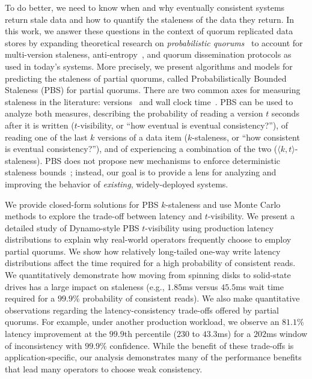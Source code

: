 \documentclass{vldb}
\begin{document}
To do better, we need to know when and why eventually consistent
systems return stale data and how to quantify the staleness of the
data they return.  In this work, we answer these questions in the
context of quorum replicated data stores by expanding theoretical
research on \textit{probabilistic quorums}~\cite{prob-quorum,
  quorum-overview} to account for multi-version staleness,
anti-entropy~\cite{antientropy}, and quorum dissemination protocols as
used in today's systems.  More precisely, we present algorithms and
models for predicting the staleness of partial quorums, called
Probabilistically Bounded Staleness (PBS) for partial quorums. There
are two common axes for measuring staleness in the literature:
versions~\cite{aqua, frac} and wall clock time~\cite{vahdat-article,
  vahdat-bounded}.  PBS can be used to analyze both measures,
describing the probability of reading a version $t$ seconds after it is
written ($t$-visibility, or ``how eventual is eventual
consistency?''), of reading one of the last $k$ versions of
a data item ($k$-staleness, or ``how consistent is eventual
consistency?''), and of experiencing a combination of the two
($\langle k, t \rangle$-staleness). PBS does not propose new
mechanisms to enforce deterministic staleness bounds~\cite{ aqua,
  trapp,vahdat-article, vahdat-bounded, frac}; instead, our goal is to
provide a lens for analyzing and improving the behavior of
\textit{existing}, widely-deployed systems.

We provide closed-form solutions for PBS $k$-staleness and use Monte
Carlo methods to explore the trade-off between latency and
$t$-visibility.  We present a detailed study of Dynamo-style PBS
$t$-visibility using production latency distributions to explain why
real-world operators frequently choose to employ partial quorums. We
show how relatively long-tailed one-way write latency distributions
affect the time required for a high probability of consistent reads.
We quantitatively demonstrate how moving from spinning disks to
solid-state drives has a large impact on staleness (e.g., $1.85$ms
versus $45.5$ms wait time required for a $99.9$\% probability of
consistent reads).  We also make quantitative observations regarding the
latency-consistency trade-offs offered by partial quorums.  For
example, under another production workload, we observe an $81.1\%$
latency improvement at the $99.9$th percentile ($230$ to $43.3$ms)
for a $202$ms window of inconsistency with $99.9\%$ confidence.  While
the benefit of these trade-offs is application-specific, our analysis
demonstrates many of the performance benefits that lead many operators to choose weak
consistency.
\end{document}
